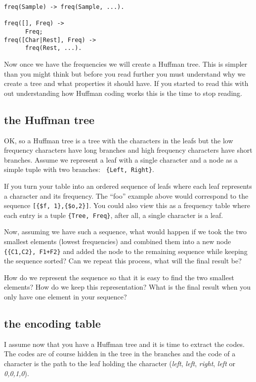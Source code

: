 \documentclass[a4paper,11pt]{article}
\begin{document}
\begin{verbatim}
freq(Sample) -> freq(Sample, ...).

freq([], Freq) -> 
      Freq;
freq([Char|Rest], Freq) ->
      freq(Rest, ...). 
\end{verbatim}

Now once we have the frequencies we will create a Huffman tree. This
is simpler than you might think but before you read further you must
understand why we create a tree and what properties it should have. If
you started to read this with out understanding how Huffman coding
works this is the time to stop reading.

\subsection{the Huffman tree}

OK, so a Huffman tree is a tree with the characters in the leafs but
the low frequency characters have long branches and high frequency
characters have short branches. Assume we represent a leaf with a
single character and a node as a simple tuple with two branches: {\tt
  \{Left, Right\}}. 

If you turn your table into an ordered sequence of leafs where each
leaf represents a character and its frequency. The ``foo'' example
above would correspond to the sequence {\tt [\{\$f, 1\},\{\$o,2\}]}.
You could also view this as a frequency table where each entry is a
tuple {\tt \{Tree, Freq\}}, after all, a single character is a leaf.

Now, assuming we have such a sequence, what would happen if we took
the two smallest elements (lowest frequencies) and combined them into
a new node {\tt \{\{C1,C2\}, F1+F2\}} and added the node to the
remaining sequence while keeping the sequence sorted? Can we repeat
this process, what will the final result be?

How do we represent the sequence so that it is easy to find the two
smallest elements? How do we keep this representation? What is the
final result when you only have one element in your sequence?

\subsection{the encoding table}

I assume now that you have a Huffman tree and it is time to extract
the codes. The codes are of course hidden in the tree in the branches
and the code of a character is the path to the leaf holding the
character ({\em left}, {\em left}, {\em right}, {\em left} or {\em
  0,0,1,0}).
\end{document}
